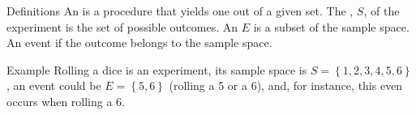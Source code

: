 \documentclass[a4paper]{article}
\begin{document}
\begin{parag}{Definitions}
    An  is a procedure that yields one  out of a given set. The , $S$, of the experiment is the set of possible outcomes. An  $E$ is a subset of the sample space. An event  if the outcome belongs to the sample space.

    \begin{subparag}{Example}
        Rolling a dice is an experiment, its sample space is $S = \left\{1, 2, 3, 4, 5, 6\right\}$, an event could be $E = \left\{5, 6\right\}$ (rolling a 5 or a 6), and, for instance, this even occurs when rolling a 6.
    \end{subparag}
\end{parag}
\end{document}
